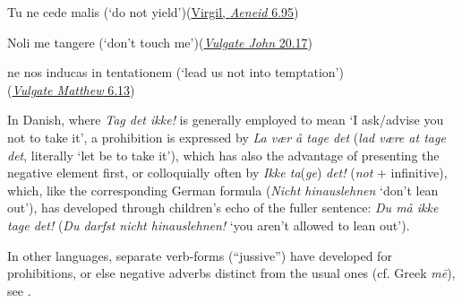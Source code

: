 \ea \label{ex:08-90}
Tu ne cede malis \phantom{x} (`do not yield')\hfill(\href{https://archive.org/details/virgil-aeneid-loeb/page/n529/mode/2up?q=%22tu+ne+cede+malis%22&view=theater}{Virgil, \textit{Aeneid} 6.95})
\z

\ea \label{ex:08-91}
Noli me tangere \phantom{x} (`don't touch me')\hfill(\href{https://archive.org/details/vulgatenewtesta00jerogoog/page/n171/mode/2up?view=theater&q=%22tangere%22}{\textit{Vulgate John} 20.17})
\z

\ea \label{ex:08-92} ne nos inducas in tentationem \phantom{x} (`lead us not into temptation')\\\hfill(\href{https://archive.org/details/vulgatenewtesta00jerogoog/page/n23/mode/2up?view=theater&q=%22inducas%22}{\textit{Vulgate Matthew} 6.13})
\z

In Danish, where \textit{Tag det ikke!} is generally employed to mean `I ask/advise you not to take it', a prohibition is expressed by \textit{La vær å tage det} (\textit{lad være at tage det}, literally `let be to take it'), %
which has also the advantage of presenting the negative element first, or colloquially often by \textit{Ikke ta}(\textit{ge}) \textit{det!} (\textit{not} + infinitive), which, like the corresponding German formula (\textit{Nicht hinauslehnen} `don't lean out'), has developed through children's echo of the fuller sentence: \textit{Du må ikke tage det!} (\textit{Du darfst nicht hinauslehnen!} `you aren't allowed to lean out').

In other languages, separate verb-forms (``jussive'') have developed for prohibitions, or else negative adverbs distinct from the usual ones (cf. Greek \textit{mē}), see \citet[\href{https://archive.org/details/charakteristik-der-hauptsachlichsten/page/22/mode/2up?view=theater}{22}]{misteli1893charakteristik}.

